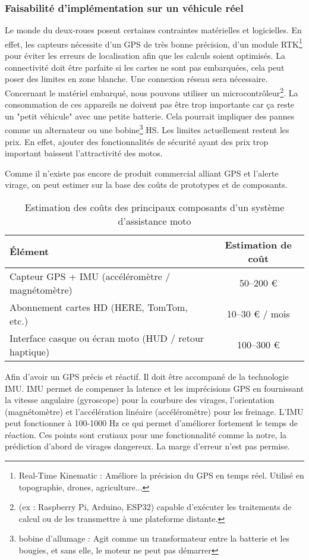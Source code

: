 \subsubsection{Faisabilité d’implémentation sur un véhicule réel}
Le monde du deux-roues posent certaines contraintes matérielles et logicielles. En effet, les capteurs nécessite d’un GPS de très bonne précision, d'un module RTK\footnote{Real-Time Kinematic : Améliore la précision du GPS en temps réel. Utilisé en topographie, drones, agriculture...} pour éviter les erreurs de localisation afin que les calculs soient optimisés. La connectivité doit être parfaite si les cartes ne sont pas embarquées, cela peut poser des limites en zone blanche. Une connexion réseau sera nécessaire. Concernant le matériel embarqué, nous pouvons utiliser un  microcontrôleur\footnote{ (ex : Raspberry Pi, Arduino, ESP32) capable d’exécuter les traitements de calcul ou de les transmettre à une plateforme distante.}. La consommation de ces appareils ne doivent pas être trop importante car ça reste un "petit véhicule" avec une petite batterie. Cela pourrait impliquer des pannes comme un alternateur ou une bobine\footnote{bobine d’allumage : Agit comme un transformateur entre la batterie et les bougies, et sans elle, le moteur ne peut pas démarrer} HS.
Les limites actuellement restent les prix. En effet, ajouter des fonctionnalités de sécurité ayant des prix trop important baissent l'attractivité des motos. 

Comme il n’existe pas encore de produit commercial alliant GPS et l'alerte virage, on peut estimer sur la base des coûts de prototypes et de composants.

\begin{table}[h!]
\centering
\begin{tabular}{|p{7cm}|c|}
\hline
\textbf{Élément} & \textbf{Estimation de coût} \\
\hline
Capteur GPS + IMU (accéléromètre / magnétomètre) & 50–200 € \\
Abonnement cartes HD (HERE, TomTom, etc.) & 10–30 € / mois \\
Interface casque ou écran moto (HUD / retour haptique) & 100–300 € \\
\hline
\end{tabular}
\caption{Estimation des coûts des principaux composants d'un système d’assistance moto}
\label{tab:couts-composants}
\end{table}
Afin d'avoir un GPS précis et réactif. Il doit être accompané de la technologie IMU. IMU permet de compenser la latence et les imprécisions GPS en fournissant la vitesse angulaire (gyroscope) pour la courbure des virages, l'orientation (magnétomètre) et l'accélération linéaire (accéléromètre) pour les freinage. L'IMU peut fonctionner à 100-1000 Hz ce qui permet d'améliorer fortement le temps de réaction. Ces points sont crutiaux pour une fonctionnalité comme la notre, la prédiction d'abord de virages dangereux. La marge d'erreur n'est pas permise.

